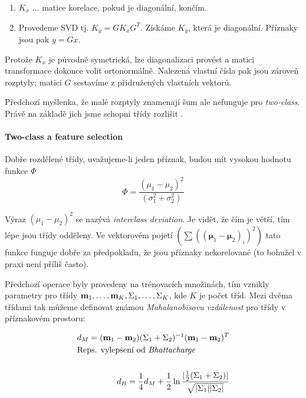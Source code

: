 \begin{enumerate}
\item $K_x$ $\dots$ matice korelace, pokud je diagonální, končím.
\item Provedeme SVD tj. $K_y=GK_xG^T$. Získáme $K_y$, která je diagonální. Příznaky jsou pak $y=Gx$.
\end{enumerate}

Protože $K_x$ je původně symetrická, lze diagonalizaci provést a matici transformace dokonce volit ortonormálně.
Nalezená vlastní čísla pak jsou zároveň rozptyly; matici $G$ sestavíme z přidružených vlastních vektorů.

Předchozí myšlenka, že malé rozptyly znamenají šum ale nefunguje pro {\em two-class}. Právě na základě jich
jsme schopni třídy rozlišit .

\paragraph{Two-class a feature selection}

Dobře rozdělené třídy, uvažujeme-li jeden příznak, budou mít vysokou hodnotu funkce $\Phi$
\begin{equation}
\Phi=\frac{(\mu_1-\mu_2)^2}{(\sigma_1^2+\sigma_2^2)}
\end{equation}

\def\bmu{\mathbf{\mu}}
Výraz $(\mu_1-\mu_2)^2$ se nazývá {\em interclass deviation}. Je vidět, že čím je větší, tím lépe jsou třídy odděleny.
Ve vektorovém pojetí $(\sum((\bmu_1-\bmu_2)_i)^2)$ tato funkce funguje dobře  za předpokladu, že jsou příznaky nekorelované (to bohužel v praxi 
není příliš často). 

Předchozí operace byly provedeny na trénovacích množinách, tím vznikly parametry pro třídy $\mathbf{m}_1, \dots, \mathbf{m}_K,
\Sigma_1,\dots,\Sigma_K$, kde $K$ je počet tříd. Mezi dvěma třídami tak můžeme definovat známou {\em Mahalanobisovu 
vzdálenost} pro třídy v příznakovém prostoru:

\begin{eqnarray}
d_M=(\m_1-\m_2)(\Sigma_1+\Sigma_2)^{-1}(\m_1-\m_2)^T\\
\noalign{\hbox{Reps. vylepšení od {\em Bhattacharge}}}\\
d_B=\frac{1}{4}d_M+\frac{1}{2}\ln\frac{|\frac{1}{2}(\Sigma_1+\Sigma_2)|}{\sqrt{|\Sigma_1||\Sigma_2|}}
\end{eqnarray}
 
